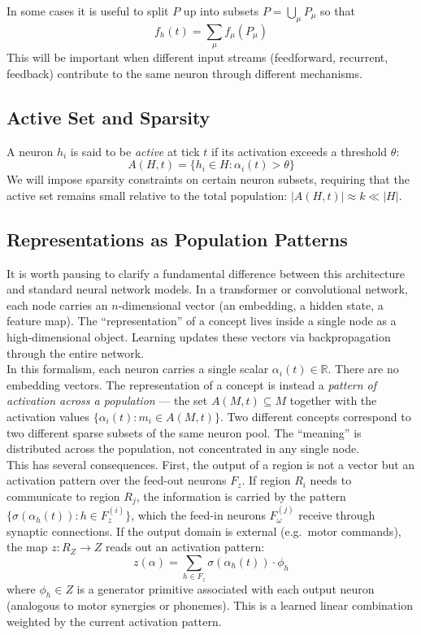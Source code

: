 \documentclass[11pt]{article}
\begin{document}
In some cases it is useful to split $P$ up into subsets $P = \bigcup_\mu P_\mu$ so that
\begin{equation}
    f_h(t) = \sum_\mu f_\mu(P_\mu)
\end{equation}
This will be important when different input streams (feedforward, recurrent, feedback) contribute to the same neuron through different mechanisms.

\subsection{Active Set and Sparsity}
A neuron $h_i$ is said to be \textit{active} at tick $t$ if its activation exceeds a threshold $\theta$:
\begin{equation}
    A(H, t) = \{h_i \in H : \alpha_i(t) > \theta \}
\end{equation}
We will impose sparsity constraints on certain neuron subsets, requiring that the active set remains small relative to the total population: $|A(H,t)| \approx k \ll |H|$.

\subsection{Representations as Population Patterns}
It is worth pausing to clarify a fundamental difference between this architecture and standard neural network models. In a transformer or convolutional network, each node carries an $n$-dimensional vector (an embedding, a hidden state, a feature map). The ``representation'' of a concept lives inside a single node as a high-dimensional object. Learning updates these vectors via backpropagation through the entire network.\\

In this formalism, each neuron carries a single scalar $\alpha_i(t) \in \mathbb{R}$. There are no embedding vectors. The representation of a concept is instead a \textit{pattern of activation across a population} --- the set $A(M, t) \subseteq M$ together with the activation values $\{\alpha_i(t) : m_i \in A(M, t)\}$. Two different concepts correspond to two different sparse subsets of the same neuron pool. The ``meaning'' is distributed across the population, not concentrated in any single node.\\

This has several consequences. First, the output of a region is not a vector but an activation pattern over the feed-out neurons $F_z$. If region $R_i$ needs to communicate to region $R_j$, the information is carried by the pattern $\{\sigma(\alpha_h(t)) : h \in F_z^{(i)}\}$, which the feed-in neurons $F_\omega^{(j)}$ receive through synaptic connections. If the output domain is external (e.g.\ motor commands), the map $z: R_Z \to Z$ reads out an activation pattern:
\begin{equation}
    z(\alpha) = \sum_{h \in F_z} \sigma(\alpha_h(t)) \cdot \phi_h
\end{equation}
where $\phi_h \in Z$ is a generator primitive associated with each output neuron (analogous to motor synergies or phonemes). This is a learned linear combination weighted by the current activation pattern.\\
\end{document}
